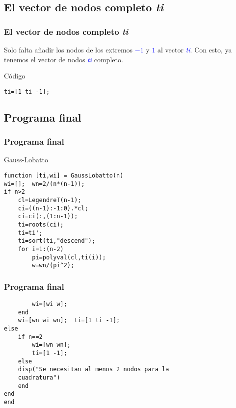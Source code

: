 \documentclass{beamer}
\begin{document}
\subsection{El vector de nodos completo \textit{ti}}
\begin{frame}[fragile]
\frametitle{El vector de nodos completo \textit{ti}}
Solo falta añadir los nodos de los extremos \textcolor{blue}{$-1$} y \textcolor{blue}{$1$} al vector \textcolor{blue}{\textit{ti}}. Con esto, ya tenemos el vector de nodos \textcolor{blue}{\textit{ti}} completo.

\begin{exampleblock}{Código}
\begin{verbatim}
ti=[1 ti -1];
\end{verbatim}
\end{exampleblock}
\end{frame}


\subsection{Programa final}
\begin{frame}[fragile]
\frametitle{Programa final}
\begin{exampleblock}{Gauss-Lobatto}
\begin{verbatim}
function [ti,wi] = GaussLobatto(n)
wi=[];  wn=2/(n*(n-1));
if n>2
    cl=LegendreT(n-1);
    ci=((n-1):-1:0).*cl;
    ci=ci(:,(1:n-1));
    ti=roots(ci);
    ti=ti';
    ti=sort(ti,"descend");
    for i=1:(n-2)
        pi=polyval(cl,ti(i));
        w=wn/(pi^2);
\end{verbatim}
\end{exampleblock}
\end{frame}


\begin{frame}[fragile]
\frametitle{Programa final}
\begin{exampleblock}{}
\begin{verbatim}
        wi=[wi w];
    end
    wi=[wn wi wn];  ti=[1 ti -1];
else 
    if n==2
        wi=[wn wn];
        ti=[1 -1];
    else
    disp("Se necesitan al menos 2 nodos para la 
    cuadratura")
    end
end
end
\end{verbatim}
\end{exampleblock}
\end{frame}
\end{document}
